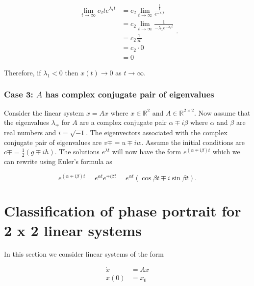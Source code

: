 \documentclass[12pt]{article}
\theoremstyle{definition}
\begin{document}
\begin{equation*}
\begin{split}
\lim_{t \rightarrow \infty} c_2 t e^{\lambda_1 t} &= c_2 \lim_{t \rightarrow \infty} \frac{\frac{t}{1}}{e^{-\lambda_1 t}} \\
&= c_2 \lim_{t \rightarrow \infty} \frac{1}{-\lambda_1 e^{-\lambda_1 t}} \\
&= c_2 \frac{1}{\infty} \\
&= c_2 \cdot 0 \\
&= 0
\end{split}
.
\end{equation*}

Therefore, if $\lambda_1 < 0$ then $x(t) \rightarrow 0$ as $t \rightarrow \infty$.

\subsubsection{Case 3: $A$ has complex conjugate pair of eigenvalues}

Consider the linear system $\dot x = Ax$ where $x \in \mathbb{R}^2$ and $A \in \mathbb{R}^{2 \times 2}$. Now assume that the eigenvalues $\lambda_{\mp}$ for $A$ are a complex conjugate pair $\alpha \mp i \beta$ where $\alpha$ and $\beta$ are real numbers and $i = \sqrt{-1}$. The eigenvectors associated with the complex conjugate pair of eigenvalues are $v \mp = u \mp i w$. Assume the initial conditions are $c \mp = \frac{1}{2} (g \mp i h)$. The solutions $e^{\lambda t}$ will now have the form $e^{(\alpha \mp i \beta)t}$ which we can rewrite using Euler's formula as

\begin{equation*}
e^{(\alpha \mp i \beta)t} = e^{\alpha t} e^{\mp i \beta t} = e^{\alpha t}(\cos \beta t \mp i \sin \beta t).
\end{equation*}



\section{Classification of phase portrait for 2 x 2 linear systems}

In this section we consider linear systems of the form

\begin{equation*}
\begin{split}
\dot x &= Ax \\
x(0) &= x_0
\end{split}
\end{equation*}
\end{document}
